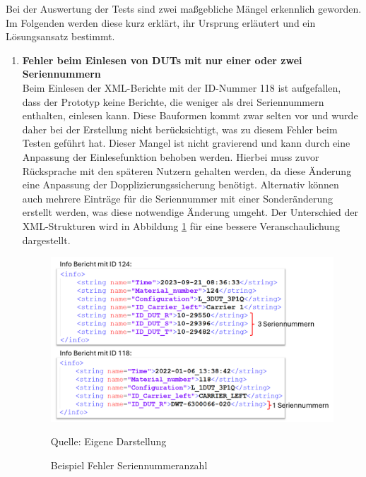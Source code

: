 Bei der Auswertung der Tests sind zwei maßgebliche Mängel erkennlich geworden.
Im Folgenden werden diese kurz erklärt, ihr Ursprung erläutert und ein Lösungsansatz bestimmt.

\begin{enumerate}


\item \textbf{Fehler beim Einlesen von DUTs mit nur einer oder zwei Seriennummern} \\
Beim Einlesen der XML-Berichte mit der ID-Nummer 118 ist aufgefallen, dass der Prototyp keine Berichte, die weniger als drei Seriennummern enthalten, einlesen kann.
Diese Bauformen kommt zwar selten vor und wurde daher bei der Erstellung nicht berücksichtigt, was zu diesem Fehler beim Testen geführt hat.
Dieser Mangel ist nicht gravierend und kann durch eine Anpassung der Einlesefunktion behoben werden.
Hierbei muss zuvor Rücksprache mit den späteren Nutzern gehalten werden, da diese Änderung eine Anpassung der Dopplizierungssicherung benötigt.
Alternativ können auch mehrere Einträge für die Seriennummer mit einer Sonderänderung erstellt werden, was diese notwendige Änderung umgeht.
Der Unterschied der XML-Strukturen wird in Abbildung \ref{fig:Beispiel Fehler Seriennummeranzahl} für eine bessere Veranschaulichung dargestellt.

\begin{figure}[H]
    \centering
    \includegraphics[width=1\textwidth]{Grafiken/Beispiel Fehler Seriennummeranzahl.png}
    \caption{Beispiel Fehler Seriennummeranzahl}
    \label{fig:Beispiel Fehler Seriennummeranzahl}
    {Quelle: Eigene Darstellung}
\end{figure}


\end{enumerate}
